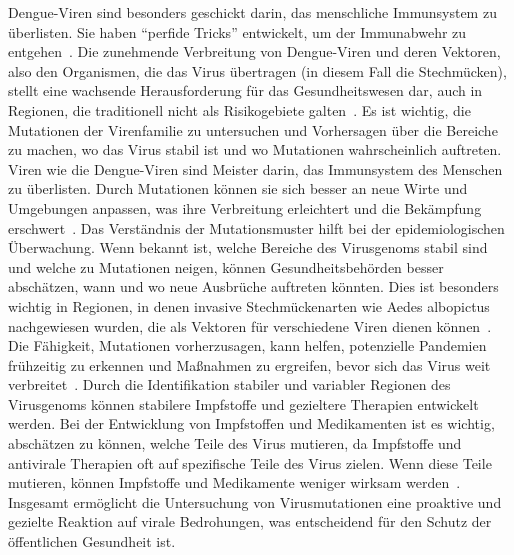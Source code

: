 \documentclass[german,version-2022-01]{uzl-thesis}
\begin{document}
\begin{figure}[tbp]
\end{figure} Dengue-Viren sind besonders geschickt darin, das menschliche Immunsystem zu \"uberlisten. Sie haben "`perfide Tricks"' entwickelt, um der Immunabwehr zu entgehen~\cite{janisch_klein_2017}. Die zunehmende Verbreitung von Dengue-Viren und deren Vektoren, also den Organismen, die das Virus \"ubertragen (in diesem Fall die Stechm\"ucken), stellt eine wachsende Herausforderung f\"ur das Gesundheitswesen dar, auch in Regionen, die traditionell nicht als Risikogebiete galten~\cite{cramer_dengue-virus_2014}. Es ist wichtig, die Mutationen der Virenfamilie zu untersuchen und Vorhersagen \"uber die Bereiche zu machen, wo das Virus stabil ist und wo Mutationen wahrscheinlich auftreten. Viren wie die Dengue-Viren sind Meister darin, das Immunsystem des Menschen zu \"uberlisten. Durch Mutationen k\"onnen sie sich besser an neue Wirte und Umgebungen anpassen, was ihre Verbreitung erleichtert und die Bek\"ampfung erschwert~\cite{cramer_dengue-virus_2014, janisch_klein_2017}. Das Verst\"andnis der Mutationsmuster hilft bei der epidemiologischen \"Uberwachung. Wenn bekannt ist, welche Bereiche des Virusgenoms stabil sind und welche zu Mutationen neigen, k\"onnen Gesundheitsbeh\"orden besser absch\"atzen, wann und wo neue Ausbr\"uche auftreten k\"onnten. Dies ist besonders wichtig in Regionen, in denen invasive Stechm\"uckenarten wie Aedes albopictus nachgewiesen wurden, die als Vektoren f\"ur verschiedene Viren dienen k\"onnen~\cite{cramer_dengue-virus_2014}. Die F\"ahigkeit, Mutationen vorherzusagen, kann helfen, potenzielle Pandemien fr\"uhzeitig zu erkennen und Ma\ss{}nahmen zu ergreifen, bevor sich das Virus weit verbreitet~\cite{janisch_klein_2017}. Durch die Identifikation stabiler und variabler Regionen des Virusgenoms k\"onnen stabilere Impfstoffe und gezieltere Therapien entwickelt werden. Bei der Entwicklung von Impfstoffen und Medikamenten ist es wichtig, absch\"atzen zu k\"onnen, welche Teile des Virus mutieren, da Impfstoffe und antivirale Therapien oft auf spezifische Teile des Virus zielen. Wenn diese Teile mutieren, k\"onnen Impfstoffe und Medikamente weniger wirksam werden~\cite{janisch_klein_2017}. 
Insgesamt erm\"oglicht die Untersuchung von Virusmutationen eine proaktive und gezielte Reaktion auf virale Bedrohungen, was entscheidend f\"ur den Schutz der \"offentlichen Gesundheit ist.
\end{document}
